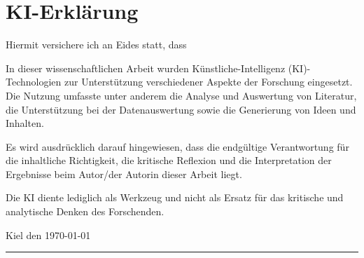 \section*{KI-Erklärung}


Hiermit versichere ich an Eides statt, dass


In dieser wissenschaftlichen Arbeit wurden Künstliche-Intelligenz (KI)-Technologien zur Unterstützung verschiedener Aspekte der Forschung eingesetzt. Die Nutzung umfasste unter anderem die Analyse und Auswertung von Literatur, die Unterstützung bei der Datenauswertung sowie die Generierung von Ideen und Inhalten.

Es wird ausdrücklich darauf hingewiesen, dass die endgültige Verantwortung für die inhaltliche Richtigkeit, die kritische Reflexion und die Interpretation der Ergebnisse beim Autor/der Autorin dieser Arbeit liegt.

Die KI diente lediglich als Werkzeug und nicht als Ersatz für das kritische und analytische Denken des Forschenden.


Kiel den \today

\vspace{1cm} %

\rule{6cm}{1pt} %
\\ %
\me %